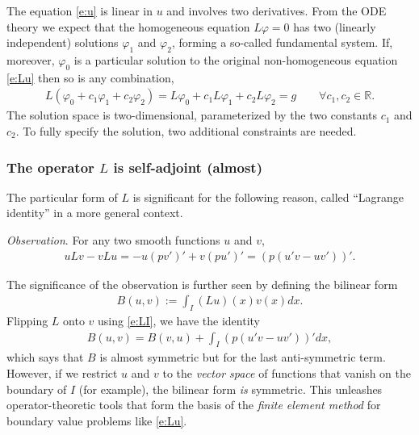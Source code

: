 \documentclass[12pt,a4paper]{article}
\newcommand{\IR}{\mathbb{R}}
\begin{document}
    The equation \eqref{e:u} is linear in $u$ and involves two derivatives.
    From the ODE theory we expect that
    the homogeneous equation
    $L \varphi = 0$
    has two (linearly independent) solutions
    $\varphi_1$ and $\varphi_2$,
    forming a so-called fundamental system.
    If, moreover, $\varphi_0$ is a particular solution
    to the original non-homogeneous equation \eqref{e:Lu}
    then so is any combination,
    \begin{align}
        L(\varphi_0 + c_1 \varphi_1 + c_2 \varphi_2)
        =
        L \varphi_0
        +
        c_1 L \varphi_1
        +
        c_2 L \varphi_2
        = 
        g
        \qquad
        \forall c_1, c_2 \in \IR
        .
    \end{align}
    The solution space is two-dimensional,
    parameterized by the two constants $c_1$ and $c_2$.
    To fully specify the solution,
    two additional constraints are needed.
    
    
    
    \subsubsection*{The operator $L$ is self-adjoint (almost)}
    
    The particular form of $L$ is significant 
    for the following reason,
    called ``Lagrange identity'' in a more general context.
    
    \emph{Observation}.
    For any two smooth functions $u$ and $v$,
    \begin{align}
        \label{e:LI}
        u L v - v L u
        =
        - u (p v')'
        + v (p u')'
        =
        (p (u' v - u v'))'
        .
    \end{align}

    
    The significance of the observation 
    is further seen by defining
    the bilinear form
    \begin{align}
        B(u, v) 
        :=
        \int_I (L u)(x) v(x) dx
        .
    \end{align}
    Flipping $L$ onto $v$ using \eqref{e:LI}, 
    we have the identity
    \begin{align}
        B(u, v)
        =
        B(v, u)
        +
        \int_I (p (u' v - u v'))' dx
        ,
    \end{align}
    which says that $B$ is almost symmetric
    but for the last anti-symmetric term.
    However,
    if we restrict $u$ and $v$ 
    to the \emph{vector space} of functions
    that vanish on the boundary of $I$
    (for example),
    the bilinear form \emph{is} symmetric.
    This unleashes operator-theoretic tools
    that form the basis of 
    the \emph{finite element method}
    for boundary value problems like \eqref{e:Lu}.
    
\end{document}
